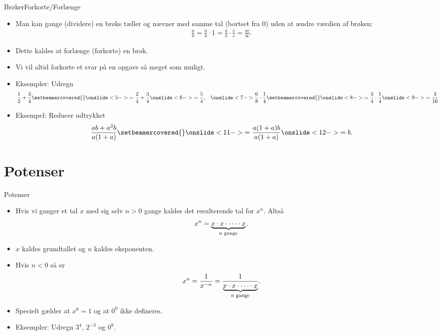 \begin{frame}{Brøker}{Forkorte/Forlænge}
\begin{itemize}
		\setlength\itemsep{1em}
	\item<1-> Man kan gange (dividere) en brøks tæller og nævner med samme tal (bortset fra 0) uden at ændre værdien af brøken:
	\begin{align*}
	\frac{a}{b}=\frac{a}{b}\cdot1=\frac{a}{b}\cdot \frac{c}{c}=\frac{ac}{bc}.
	\end{align*}
	\item<2-> Dette kaldes at forlænge (forkorte) en brøk. 
	\item<3-> Vi vil altid forkorte et svar på en opgave så meget som muligt.
	\item<4-> Eksempler: Udregn
	\begin{align*}
	\frac{1}{2}+\frac{3}{4}\setbeamercovered{}\onslide<5->{=\frac{2}{4}+\frac{3}{4}\onslide<6->{=\frac{5}{4}}},&& \onslide<7->{\frac{6}{8}\cdot\frac{1}{4}\setbeamercovered{}\onslide<8->{=\frac{3}{4}\cdot \frac{1}{4}\onslide<9->{=\frac{3}{16}}}}
	\end{align*}
	\item<10-> Eksempel: Reducer udtrykket
	\begin{align*}
	\frac{ab+a^2b}{a(1+a)}\setbeamercovered{}\onslide<11->{=\frac{a(1+a)b}{a(1+a)}\onslide<12->{=b}}.
	\end{align*}
\end{itemize}
\end{frame}



\section{Potenser}
\begin{frame}{Potenser}
\begin{itemize}
		\setlength\itemsep{1em}
	\item<1-> Hvis vi ganger et tal $x$ med sig selv $n> 0$ gange kaldes det resulterende tal for $x^n$. Altså
	\begin{align*}
	x^n=\underbrace{x \cdot x \cdot \dots \cdot x}_{\textup{n gange}}.
	\end{align*}
	\item<2-> $x$ kaldes grundtallet og $n$ kaldes eksponenten.
	\item<3-> Hvis $n<0$ så er
	\begin{align*}
	x^n=\frac{1}{x^{-n}}=\frac{1}{\underbrace{x \cdot x \cdot \dots \cdot x}_{\textup{n gange}}}.
	\end{align*}
	\item<4-> Specielt gælder at $x^0=1$ og at $0^0$ ikke defineres.
	\item<5-> Eksempler: Udregn $3^4$, $2^{-3}$ og $0^8$.
\end{itemize}
\end{frame}

